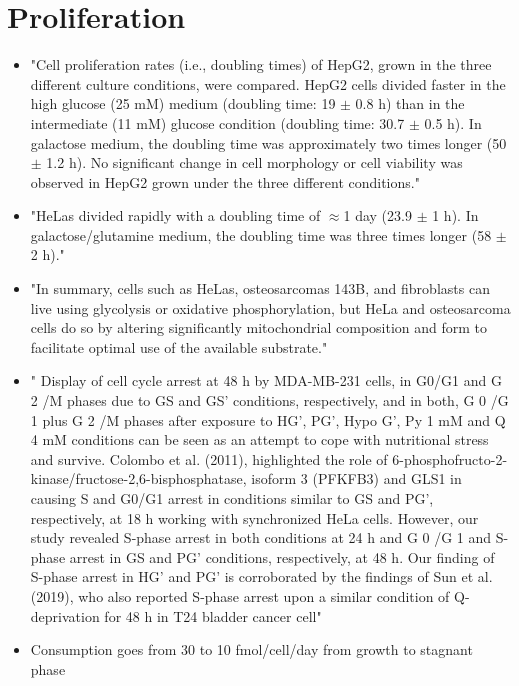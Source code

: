\documentclass[11pt,a4paper]{article}
\begin{document}
\section{Proliferation}
\begin{itemize}
\item "Cell proliferation rates (i.e., doubling times) of HepG2, grown in the three different culture conditions, were compared. HepG2 cells divided faster in the high glucose (25 mM) medium (doubling time: 19 $\pm$ 0.8 h) than in the intermediate (11 mM) glucose condition (doubling time: 30.7 $\pm$ 0.5 h). In galactose medium, the doubling time was approximately two times longer (50 $\pm$ 1.2 h). No significant change in cell morphology or cell viability was observed in HepG2 grown under the three different conditions."\cite{Domenis2012}

\item "HeLas divided rapidly with a doubling time of $\approx$1 day (23.9 $\pm$ 1 h). In galactose/glutamine medium, the doubling time was three times longer (58 $\pm$ 2 h)."\cite{Rossignol2004}

\item "In summary, cells such as HeLas, osteosarcomas 143B, and fibroblasts can live using glycolysis or oxidative phosphorylation, but HeLa and osteosarcoma cells do so by altering significantly mitochondrial composition and form to facilitate optimal use of the available substrate."\cite{Rossignol2004}

\item " Display of cell cycle arrest at 48 h by MDA-MB-231 cells, in G0/G1 and G 2 /M phases due to GS and GS’ conditions, respectively, and in both, G 0 /G 1 plus G 2 /M phases after exposure to HG’, PG’, Hypo G’, Py 1 mM and Q 4 mM conditions can be seen as an attempt to cope with nutritional stress and survive. Colombo et al. (2011), highlighted the role of 6-phosphofructo-2-kinase/fructose-2,6-bisphosphatase, isoform 3 (PFKFB3) and GLS1
in causing S and G0/G1 arrest in conditions similar to GS and PG’, respectively, at 18 h working with synchronized HeLa cells. However, our study revealed S-phase arrest in both conditions at 24 h and G 0 /G 1 and S-phase arrest in GS and PG’ conditions, respectively, at 48 h. Our finding of S-phase arrest in HG’ and PG’ is corroborated by the findings of
Sun et al. (2019), who also reported S-phase arrest upon a similar condition of Q-deprivation for 48 h in T24 bladder cancer cell"\cite{Prasad2023}

\item Consumption goes from 30 to 10 fmol/cell/day from growth to stagnant phase \cite{Zhang2011}


\end{itemize}
\end{document}
